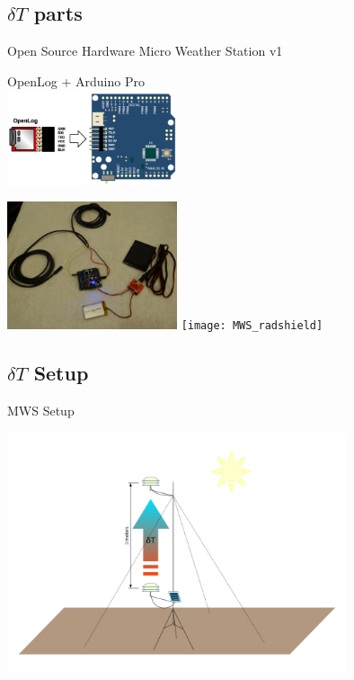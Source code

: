 \documentclass[xcolor=dvipsnames,beamer]{beamer} %
\begin{document}
\subsection{ $\delta T$ parts}
\begin{frame}[fragile]{Open Source Hardware Micro Weather Station v1}

\begin{center}
OpenLog + Arduino Pro\\
\vspace{5mm}
\includegraphics[width=5cm]{Arduino_OpenLog}
\end{center}

\begin{flushright}
  \includegraphics[width=5cm]{MWS}
  \hspace{5mm}
  \texttt{[image: MWS\_radshield]}
\end{flushright}
\end{frame}

\subsection{ $\delta T$ Setup}
\begin{frame}[fragile]{MWS Setup}

\begin{center}
 \includegraphics[width=10cm]{MWS_v1_deltaT_sketch_hot}
\end{center}

\end{frame}
\end{document}
